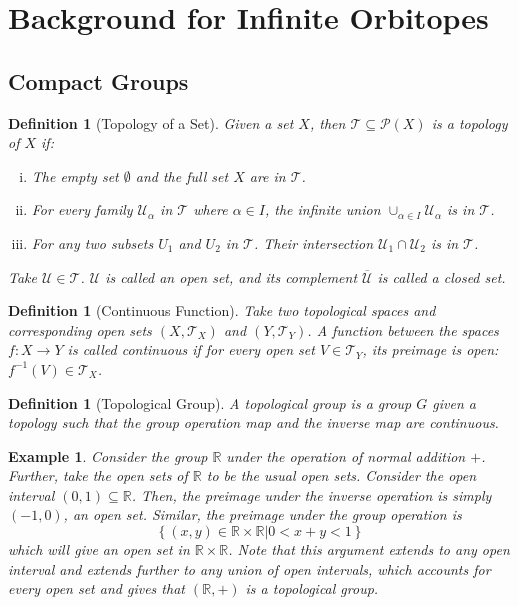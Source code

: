 \documentclass[12]{amsart}
\newtheorem{definition}[theorem]{Definition}
\newtheorem{example}[theorem]{Example}
\newcommand{\U}{\mathcal{U}}
\newcommand{\set}[1]{ \left\{ #1 \right\} }
\newcommand{\pset}[1]{\mathcal{P} (#1)} %
\newcommand{\T}{\mathcal{T}}
\begin{document}
\section{Background for Infinite Orbitopes}
\label{sec:infinite_background}
\subsection{Compact Groups}
\begin{definition}[Topology of a Set]
    Given a set $X$, then $\T \subseteq \pset{X}$ is a \emph{topology of $X$} if:
    \begin{enumerate}[(i)]
        \item The empty set $\emptyset$ and the full set $X$ are in $\T$.
        \item For every family $\U_\alpha$ in $\T$ where $\alpha \in I$, the infinite union $\cup_{\alpha\in I} \U_\alpha$ is in $\T$.
        \item For any two subsets $U_1$ and $U_2$ in $\T$. Their intersection   $\U_1 \cap \U_2$ is in $\T$.
    \end{enumerate}
    Take $\U \in \T$. $\U$ is called an \emph{open} set, and its complement $\overline{\U}$ is called a \emph{closed set}.
\end{definition}

\begin{definition}[Continuous Function]
	Take two topological spaces and corresponding open sets $(X, \T_X)$ and $(Y, \T_Y)$. A function between the spaces $f: X \to Y$ is called \emph{continuous} if for every open set $V \in \T_Y$, its preimage is open: $f^{-1}(V) \in \T_X$.
\end{definition}

\begin{definition}[Topological Group]
	A \emph{topological group} is a group $G$ given a topology such that the group operation map and the inverse map are continuous.
\end{definition}

\begin{example}
	\label{ex:(R,+)}
	Consider the group $\mathbb{R}$ under the operation of normal addition $+$. Further, take the open sets of $\mathbb{R}$ to be the usual open sets. Consider the open interval $(0,1) \subseteq \mathbb{R}$. Then, the preimage under the inverse operation is simply $(-1,0)$, an open set. Similar, the preimage under the group operation is 
$$\set{(x,y) \in \mathbb{R} \times \mathbb{R} \vert 0 < x+y < 1}$$
which will give an open set in $\mathbb{R} \times \mathbb{R}$. Note that this argument extends to any open interval and extends further to any union of open intervals, which accounts for every open set and gives that $(\mathbb{R}, +)$ is a topological group.
\end{example}
\end{document}
